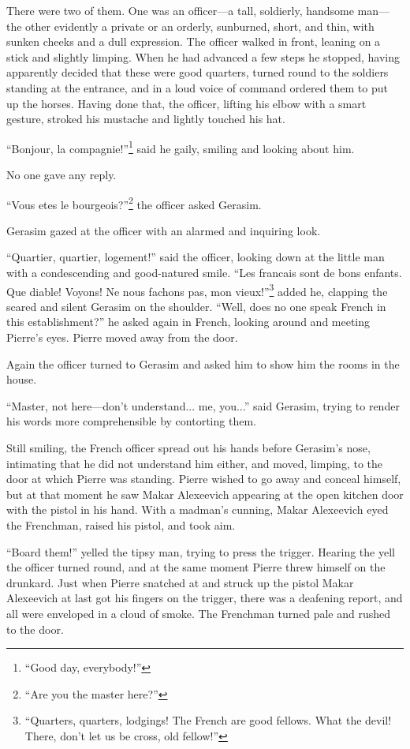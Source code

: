 There were two of them. One was an officer---a tall, soldierly,
handsome man---the other evidently a private or an orderly,
sunburned, short, and thin, with sunken cheeks and a dull
expression. The officer walked in front, leaning on a stick and
slightly limping. When he had advanced a few steps he stopped,
having apparently decided that these were good quarters, turned
round to the soldiers standing at the entrance, and in a loud
voice of command ordered them to put up the horses. Having done
that, the officer, lifting his elbow with a smart gesture,
stroked his mustache and lightly touched his hat.

``Bonjour, la compagnie!''\footnote{``Good day, everybody!''}
said he gaily, smiling and looking about him.

No one gave any reply.

``Vous etes le bourgeois?''\footnote{ ``Are you the master
here?''}  the officer asked Gerasim.

Gerasim gazed at the officer with an alarmed and inquiring look.

``Quartier, quartier, logement!'' said the officer, looking down
at the little man with a condescending and good-natured
smile. ``Les francais sont de bons enfants. Que diable! Voyons!
Ne nous fachons pas, mon vieux!''\footnote{``Quarters, quarters,
lodgings! The French are good fellows. What the devil! There,
don't let us be cross, old fellow!''}  added he, clapping the
scared and silent Gerasim on the shoulder. ``Well, does no one
speak French in this establishment?'' he asked again in French,
looking around and meeting Pierre's eyes. Pierre moved away from
the door.

Again the officer turned to Gerasim and asked him to show him the
rooms in the house.

``Master, not here---don't understand... me, you...'' said
Gerasim, trying to render his words more comprehensible by
contorting them.

Still smiling, the French officer spread out his hands before
Gerasim's nose, intimating that he did not understand him either,
and moved, limping, to the door at which Pierre was
standing. Pierre wished to go away and conceal himself, but at
that moment he saw Makar Alexeevich appearing at the open kitchen
door with the pistol in his hand. With a madman's cunning, Makar
Alexeevich eyed the Frenchman, raised his pistol, and took aim.

``Board them!'' yelled the tipsy man, trying to press the
trigger. Hearing the yell the officer turned round, and at the
same moment Pierre threw himself on the drunkard. Just when
Pierre snatched at and struck up the pistol Makar Alexeevich at
last got his fingers on the trigger, there was a deafening
report, and all were enveloped in a cloud of smoke. The Frenchman
turned pale and rushed to the door.

